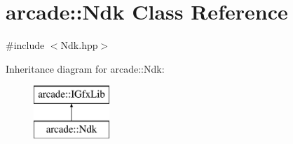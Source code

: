 \hypertarget{classarcade_1_1_ndk}{\section{arcade\-:\-:Ndk Class Reference}
\label{classarcade_1_1_ndk}
}


{\ttfamily \#include $<$Ndk.\-hpp$>$}

Inheritance diagram for arcade\-:\-:Ndk\-:\begin{figure}[H]
\begin{center}
\leavevmode
\includegraphics[height=2.000000cm]{classarcade_1_1_ndk}
\end{center}
\end{figure}

